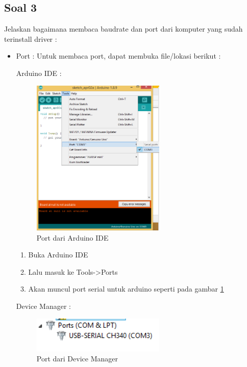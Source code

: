 \subsection{Soal 3}
Jelaskan bagaimana membaca baudrate dan port dari komputer yang sudah terinstall driver : 
\begin{itemize}
	\item Port : Untuk membaca port, dapat membuka file/lokasi berikut :
	
Arduino IDE : 
	\begin{figure} [ht]
			\centerline{\includegraphics[width=0.6\textwidth]{figures/5/1174035/Teori/PortArduinoIDE.png}}
			\caption{Port dari Arduino IDE}
			\label{IDEPorts}
		\end{figure}
		\begin{enumerate}
			\item Buka Arduino IDE
			\item Lalu masuk ke Tools->Ports
			\item Akan muncul port serial untuk arduino seperti pada gambar \ref{IDEPorts}
		\end{enumerate}
Device Manager : 
	\begin{figure} [ht]
			\centerline{\includegraphics[width=0.6\textwidth]{figures/5/1174035/Teori/PortDeviceManager.png}}
			\caption{Port dari Device Manager}
			\label{DevManPort}
		\end{figure}
		\begin{enumerate}

\end{enumerate}
\end{itemize}

